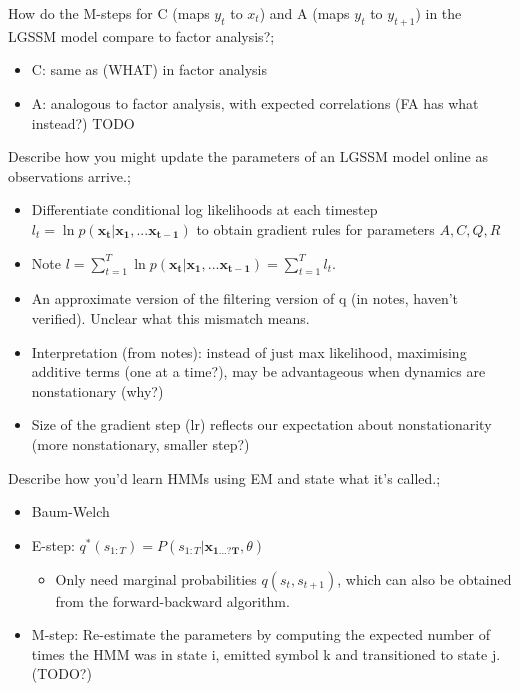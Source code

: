 \documentclass{article}
\begin{document}

How do the M-steps for C (maps $y_t$ to $x_t$) and A (maps $y_t$ to $y_{t+1}$) in the LGSSM model compare to factor analysis?; \begin{itemize} \item C: same as (WHAT) in factor analysis \item A: analogous to factor analysis, with expected correlations (FA has what instead?) TODO \end{itemize}

Describe how you might update the parameters of an LGSSM model online as observations arrive.; \begin{itemize} \item Differentiate conditional log likelihoods at each timestep $l_t=\ln p(\mathbf{x_t|x_1,...x_{t-1}})$ to obtain gradient rules for parameters $A, C, Q, R$ \item Note $l=\sum_{t=1}^T\ln  p(\mathbf{x_t|x_1,...x_{t-1}})=\sum_{t=1}^Tl_t$. \item An approximate version of the filtering version of q (in notes, haven't verified). Unclear what this mismatch means. \item Interpretation (from notes): instead of just max likelihood, maximising additive terms (one at a time?), may be advantageous when dynamics are nonstationary (why?) \item Size of the gradient step (lr) reflects our expectation about nonstationarity (more nonstationary, smaller step?) \end{itemize}

Describe how you'd learn HMMs using EM and state what it's called.; \begin{itemize} \item Baum-Welch \item E-step: $q^*(s_{1:T})=P(s_{1:T}|\mathbf{x_{1...?T}}, \theta)$ \begin{itemize} \item Only need marginal probabilities $q(s_t, s_{t+1})$, which can also be obtained from the forward-backward algorithm. \end{itemize} \item M-step: Re-estimate the parameters by computing the expected number of times the HMM was in state i, emitted symbol k and transitioned to state j. (TODO?) \end{itemize}
\end{document}
